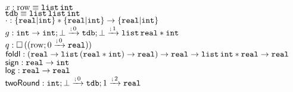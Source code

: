 \begin{tabbing}
    $ x: \trow \equiv \tlist{\tint}$\\
    $ \tdb \equiv \tlist{\tlist{\tint}} $\\
    $ \cdot: \{ \treal | \tint \} * \{ \treal | \tint \} \to \{ \treal | \tint \}$\\
    $ g: \tint \to \tarr{\tint}{
    \tarr{\tdb}{\tlist{\treal * \tint}}{\bot}{}{1}  
    }{\bot}{}{0}
    $\\      
    $ q: \tbox{  (\tarr{ \trow }{ \treal }{0}{}{0})     } $\\
    $ \mathsf{foldl} : (\treal \to \tlist{(\treal * \tint)} \to \treal) \to \treal \to \tlist{\tint * \treal} \to \treal$\\
    $ \mathsf{sign} : \treal \to \tint $\\
    $ \mathsf{log} : \treal \to \treal $\\
    $ \mathsf{twoRound} : \tarr{\tint}{
    \tarr{\tdb}{\treal}{1}{}{2}
    }
    {\bot}{}{0} $
\end{tabbing}

